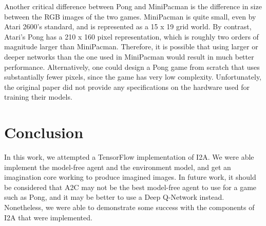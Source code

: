 \documentclass[10pt, twocolumn]{article}
\begin{document}
Another critical difference between Pong and MiniPacman is the difference in size between the RGB images of the two games. MiniPacman is quite small, even by Atari 2600's standard, and is represented as a 15 x 19 grid world. By contrast, Atari's Pong has a 210 x 160 pixel representation, which is roughly two orders of magnitude larger than MiniPacman. Therefore, it is possible that using larger or deeper networks than the one used in MiniPacman would result in much better performance. Alternatively, one could design a Pong game from scratch that uses substantially fewer pixels, since the game has very low complexity. Unfortunately, the original paper did not provide any specifications on the hardware used for training their models.

\section{Conclusion}

In this work, we attempted a TensorFlow implementation of I2A. We were able implement the model-free agent and the environment model, and get an imagination core working to produce imagined images. In future work, it should be considered that A2C may not be the best model-free agent to use for a game such as Pong, and it may be better to use a Deep Q-Network instead. Nonetheless, we were able to demonstrate some success with the components of I2A that were implemented.


{

}
\end{document}
